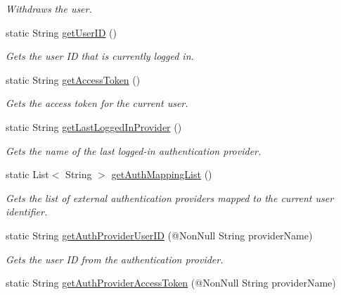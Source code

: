 \begin{DoxyCompactItemize}
\begin{DoxyCompactList}\small\item\em Withdraws the user. \end{DoxyCompactList}\item 
static String \hyperlink{classcom_1_1toast_1_1android_1_1gamebase_1_1_gamebase_ab7c1e87ef968e274d77774ea7c814f07}{get\+User\+ID} ()
\begin{DoxyCompactList}\small\item\em Gets the user ID that is currently logged in. \end{DoxyCompactList}\item 
static String \hyperlink{classcom_1_1toast_1_1android_1_1gamebase_1_1_gamebase_a7415fdfef5db5d7e6b02e82f62927e9b}{get\+Access\+Token} ()
\begin{DoxyCompactList}\small\item\em Gets the access token for the current user. \end{DoxyCompactList}\item 
static String \hyperlink{classcom_1_1toast_1_1android_1_1gamebase_1_1_gamebase_aab024fc853da20582cd6cd85ecd9f6a6}{get\+Last\+Logged\+In\+Provider} ()
\begin{DoxyCompactList}\small\item\em Gets the name of the last logged-\/in authentication provider. \end{DoxyCompactList}\item 
static List$<$ String $>$ \hyperlink{classcom_1_1toast_1_1android_1_1gamebase_1_1_gamebase_abc355ef4a49b5c6348ee31890df16431}{get\+Auth\+Mapping\+List} ()
\begin{DoxyCompactList}\small\item\em Gets the list of external authentication providers mapped to the current user identifier. \end{DoxyCompactList}\item 
static String \hyperlink{classcom_1_1toast_1_1android_1_1gamebase_1_1_gamebase_af1dc0a9194eff5829c859a6a6aa4ab7c}{get\+Auth\+Provider\+User\+ID} (@Non\+Null String provider\+Name)
\begin{DoxyCompactList}\small\item\em Gets the user ID from the authentication provider. \end{DoxyCompactList}\item 
static String \hyperlink{classcom_1_1toast_1_1android_1_1gamebase_1_1_gamebase_ae2f90bca5deb4d7dff72b890a257814f}{get\+Auth\+Provider\+Access\+Token} (@Non\+Null String provider\+Name)

\end{DoxyCompactItemize}
